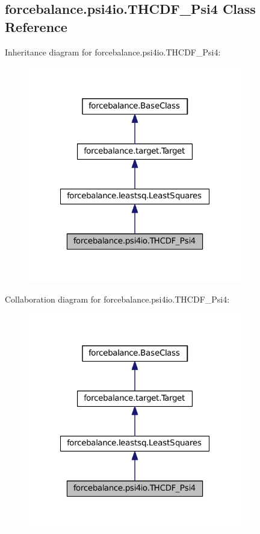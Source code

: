 \hypertarget{classforcebalance_1_1psi4io_1_1THCDF__Psi4}{\subsection{forcebalance.\-psi4io.\-T\-H\-C\-D\-F\-\_\-\-Psi4 \-Class \-Reference}
\label{classforcebalance_1_1psi4io_1_1THCDF__Psi4}
}


\-Inheritance diagram for forcebalance.\-psi4io.\-T\-H\-C\-D\-F\-\_\-\-Psi4\-:\nopagebreak
\begin{figure}[H]
\begin{center}
\leavevmode
\includegraphics[width=264pt]{classforcebalance_1_1psi4io_1_1THCDF__Psi4__inherit__graph}
\end{center}
\end{figure}


\-Collaboration diagram for forcebalance.\-psi4io.\-T\-H\-C\-D\-F\-\_\-\-Psi4\-:\nopagebreak
\begin{figure}[H]
\begin{center}
\leavevmode
\includegraphics[width=264pt]{classforcebalance_1_1psi4io_1_1THCDF__Psi4__coll__graph}
\end{center}
\end{figure}
